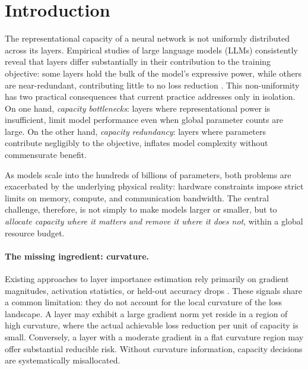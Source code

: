\documentclass[accepted]{uai2026}%
\theoremstyle{remark}%
\begin{document}
\section{Introduction}\label{sec:intro}
\vspace{-1mm}
The representational capacity of a neural network is not uniformly distributed across its layers.%
Empirical studies of large language models (LLMs) consistently reveal
that layers differ substantially in their contribution to the training
objective: some layers hold the bulk of the model's expressive power,
while others are near-redundant, contributing little to no loss reduction
\citep{inequalityOfLayers, vitel2025first}.
This non-uniformity has two practical consequences that current
practice addresses only in isolation.
On one hand, \textit{capacity bottlenecks}: layers where representational
power is insufficient, limit model performance even when global
parameter counts are large.
On the other hand, \textit{capacity redundancy}: layers where parameters
contribute negligibly to the objective, inflates model complexity
without commensurate benefit.

As models scale into the hundreds of billions of parameters, both problems are
exacerbated by the underlying physical reality: hardware constraints impose
strict limits on memory, compute, and communication bandwidth.
The central challenge, therefore, is not simply to make models larger
or smaller, but to \emph{allocate capacity where it matters and remove
it where it does not}, within a global resource budget.

\vspace{-2mm}
\paragraph{The missing ingredient: curvature.}
Existing approaches to layer importance estimation rely primarily on
gradient magnitudes, activation statistics, or held-out accuracy drops
\citep{layerIF, AVSS, layerImportanceEstimation}.
These signals share a common limitation: they do not account for the
local curvature of the loss landscape.
A layer may exhibit a large gradient norm yet reside in a region of
high curvature, where the actual achievable loss reduction per unit of
capacity is small.
Conversely, a layer with a moderate gradient in a flat curvature region
may offer substantial reducible risk.
Without curvature information, capacity decisions are systematically
misallocated.
\end{document}
